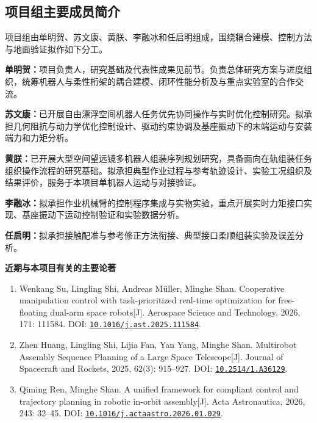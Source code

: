 \documentclass[UTF8,a4paper,zihao=-4,fontset=fandol]{ctexart}
\newcommand{\topic}[1]{\par\Needspace{4\baselineskip}\addvspace{0.5em}\noindent\textbf{#1}\par\nobreak}
\newcommand{\doi}[1]{\href{https://doi.org/#1}{\nolinkurl{#1}}}
\begin{document}
\subsection{项目组主要成员简介}

项目组由单明贺、苏文康、黄朕、李融冰和任启明组成，围绕耦合建模、控制方法与地面验证拟作如下分工。

\textbf{单明贺：}项目负责人，研究基础及代表性成果见前节。负责总体研究方案与进度组织，统筹机器人与柔性桁架的耦合建模、闭环性能分析及与重点实验室的合作交流。

\textbf{苏文康：}已开展自由漂浮空间机器人任务优先协同操作与实时优化控制研究。拟承担几何阻抗与动力学优化控制设计、驱动约束协调及基座振动下的末端运动与安装端力和力矩分析。

\textbf{黄朕：}已开展大型空间望远镜多机器人组装序列规划研究，具备面向在轨组装任务组织操作流程的研究基础。拟承担典型作业过程与参考轨迹设计、实验工况组织及结果评价，服务于本项目单机器人运动与对接验证。

\textbf{李融冰：}拟承担作业机械臂的控制程序集成与实物实验，重点开展实时力矩接口实现、基座振动下运动控制验证和实验数据分析。

\textbf{任启明：}拟承担接触配准与参考修正方法衔接、典型接口柔顺组装实验及误差分析。

\topic{近期与本项目有关的主要论著}

\begingroup
\small
{}
\begin{enumerate}[label=\arabic*.]
\item \begin{minipage}[t]{\linewidth}Wenkang Su, Lingling Shi, Andreas Müller, Minghe Shan. Cooperative manipulation control with task-prioritized real-time optimization for free-floating dual-arm space robots[J]. Aerospace Science and Technology, 2026, 171: 111584. DOI: \doi{10.1016/j.ast.2025.111584}.
\end{minipage}
\item \begin{minipage}[t]{\linewidth}Zhen Huang, Lingling Shi, Lijia Fan, Yan Yang, Minghe Shan. Multirobot Assembly Sequence Planning of a Large Space Telescope[J]. Journal of Spacecraft and Rockets, 2025, 62(3): 915--927. DOI: \doi{10.2514/1.A36129}.
\end{minipage}
\item \begin{minipage}[t]{\linewidth}Qiming Ren, Minghe Shan. A unified framework for compliant control and trajectory planning in robotic in-orbit assembly[J]. Acta Astronautica, 2026, 243: 32--45. DOI: \doi{10.1016/j.actaastro.2026.01.029}.
\end{minipage}
\end{enumerate}
\endgroup
\end{document}
